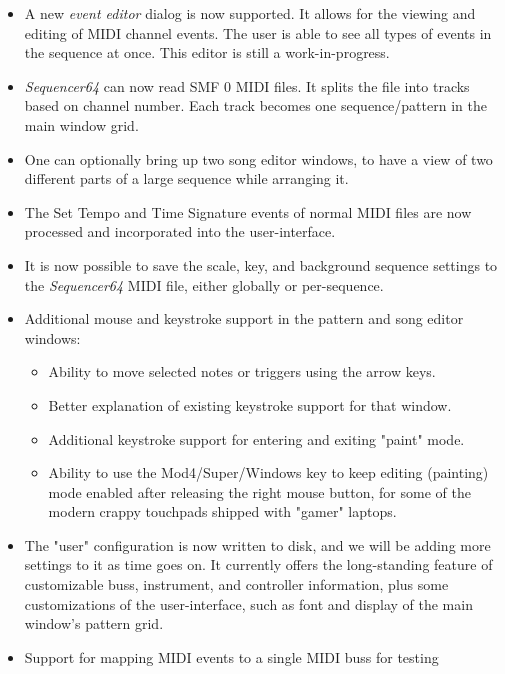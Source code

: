 \documentclass[
 11pt,
 twoside,
 a4paper,
 headinclude,
 footinclude,
 final                                 %
]{article}
\begin{document}
   \begin{itemize}
      \item A new \textsl{event editor} dialog is now supported.
         It allows for the viewing and editing of MIDI channel events.
         The user is able to see all types of events in the sequence at
         once.  This editor is still a work-in-progress.
      \item \textsl{Sequencer64} can now read SMF 0 MIDI files.  It splits
         the file into tracks based on channel number.  Each track becomes one
         sequence/pattern in the main window grid.
      \item One can optionally bring up two song editor windows, to have a view
         of two different parts of a large sequence while arranging it.
      \item The Set Tempo and Time Signature events of normal MIDI files are
         now processed and incorporated into the user-interface.
      \item It is now possible to save the scale, key, and background sequence
         settings to the \textsl{Sequencer64} MIDI file, either globally or
         per-sequence.
      \item Additional mouse and keystroke support in the pattern and song
         editor windows:
      \begin{itemize}
         \item Ability to move selected notes or triggers using the arrow keys.
         \item Better explanation of existing keystroke support for that window.
         \item Additional keystroke support for entering and exiting "paint"
            mode.
         \item Ability to use the Mod4/Super/Windows key to keep editing
            (painting) mode enabled after releasing the right mouse button,
            for some of the modern crappy touchpads shipped with
            "gamer" laptops.
      \end{itemize}
      \item The "user" configuration is now written to disk, and we will be
         adding more settings to it as time goes on.  It currently offers the
         long-standing feature of customizable buss, instrument, and controller
         information, plus some customizations of the user-interface, such as
         font and display of the main window's pattern grid.
      \item Support for mapping MIDI events to a single MIDI buss for testing

\end{itemize}
\end{document}
